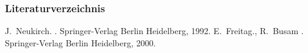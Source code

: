 \begin{frame}
    \frametitle{Literaturverzeichnis}

    \begin{thebibliography}{Freitag und Busam, 2000}
            J.~Neukirch.
            .
            \newblock Springer-Verlag Berlin Heidelberg, 1992.
            E.~Freitag., R.~Busam
            .
            \newblock Springer-Verlag Berlin Heidelberg, 2000.
    \end{thebibliography}

\end{frame}